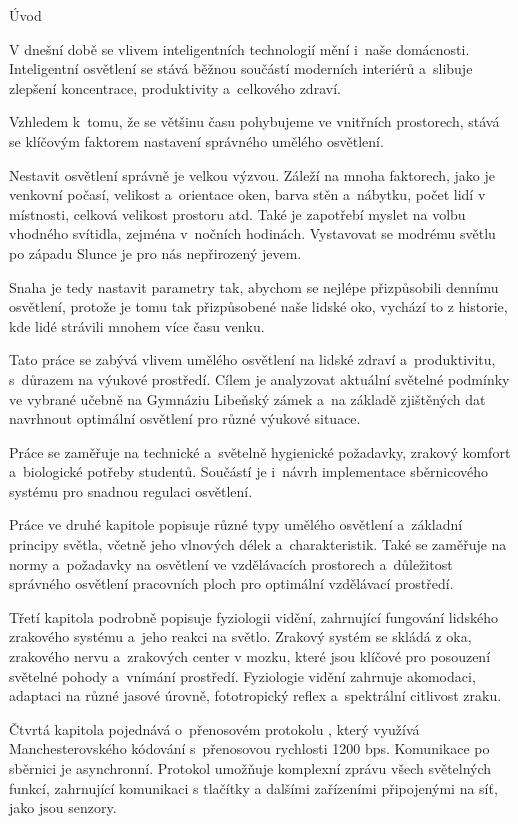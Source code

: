\chap Úvod

V dnešní době se vlivem inteligentních technologií mění i~naše domácnosti.
Inteligentní osvětlení se stává běžnou součástí moderních interiérů a~slibuje
zlepšení koncentrace, produktivity a~celkového zdraví.

Vzhledem k~tomu, že se většinu času pohybujeme ve vnitřních prostorech,
stává se klíčovým faktorem nastavení správného umělého osvětlení.

Nestavit osvětlení správně je velkou výzvou. Záleží na mnoha faktorech, jako je
venkovní počasí, velikost a~orientace oken, barva stěn a~nábytku, počet lidí v místnosti,
celková velikost prostoru atd. Také je zapotřebí myslet na volbu vhodného svítidla, zejména v~nočních hodinách.
Vystavovat se modrému světlu po západu Slunce je pro nás nepřirozený jevem.

Snaha je tedy nastavit parametry tak, abychom se nejlépe přizpůsobili dennímu osvětlení, protože je tomu tak
přizpůsobené naše lidské oko, vychází to z historie, kde lidé strávili mnohem více času venku.

Tato práce se zabývá vlivem umělého osvětlení na lidské zdraví a~produktivitu,
s~důrazem na výukové prostředí.
Cílem je analyzovat aktuální světelné podmínky ve vybrané učebně
na Gymnáziu Libeňský zámek a~na základě zjištěných dat navrhnout
optimální osvětlení pro různé výukové situace.

Práce se zaměřuje na technické a~světelně hygienické požadavky,
zrakový komfort a~biologické potřeby studentů.
Součástí je i~návrh implementace sběrnicového systému
pro snadnou regulaci osvětlení.

\medskip \medskip \medskip

Práce ve druhé kapitole popisuje různé typy umělého
osvětlení a~základní principy světla, včetně jeho vlnových délek a~charakteristik.
Také se zaměřuje na normy a~požadavky na osvětlení ve vzdělávacích
prostorech a~důležitost správného osvětlení pracovních ploch pro optimální vzdělávací prostředí.

Třetí kapitola podrobně popisuje fyziologii vidění, zahrnující
fungování lidského zrakového systému a~jeho reakci na světlo.
Zrakový systém se skládá z oka, zrakového nervu a~zrakových center v mozku,
které jsou klíčové pro posouzení světelné pohody a~vnímání prostředí.
Fyziologie vidění zahrnuje akomodaci, adaptaci na různé jasové úrovně,
fototropický reflex a~spektrální citlivost zraku.

Čtvrtá kapitola pojednává o~přenosovém protokolu , který
využívá Manchesterovského kódování s~přenosovou rychlosti 1200 bps.
Komunikace po sběrnici je asynchronní.
Protokol umožňuje komplexní zprávu všech světelných funkcí, zahrnující komunikaci
s tlačítky a dalšími zařízeními připojenými na síť, jako jsou senzory.

